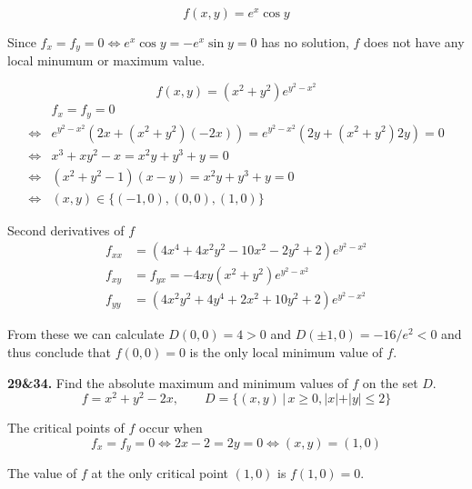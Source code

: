 \documentclass[a4paper,12pt]{article}
\newcommand{\exercise}[1]{\noindent\textbf{#1.}}
\begin{document}
\[f(x, y) = e^x\cos y\tag{13}\]

Since $f_x = f_y = 0 \iff e^x\cos y = -e^x\sin y = 0$ has no solution,
$f$ does not have any local minumum or maximum value.

\[f(x, y) = (x^2 + y^2)e^{y^2 - x^2}\tag{15}\]
\begin{align*}
  &f_x = f_y = 0\\
  \iff &e^{y^2 - x^2}(2x + (x^2 + y^2)(-2x))
      = e^{y^2 - x^2}(2y + (x^2 + y^2)2y) = 0\\
  \iff &x^3 + xy^2 - x = x^2y + y^3 + y = 0\\
  \iff &(x^2 + y^2 - 1)(x - y) = x^2y + y^3 + y = 0\\
  \iff &(x, y) \in \{(-1, 0), (0, 0), (1, 0)\}
\end{align*}

Second derivatives of $f$
\begin{align*}
  f_{xx} &= (4x^4 + 4x^2y^2 - 10x^2 - 2y^2 + 2)e^{y^2 - x^2}\\
  f_{xy} &= f_{yx} = -4xy(x^2 + y^2)e^{y^2 - x^2}\\
  f_{yy} &= (4x^2y^2 + 4y^4 + 2x^2 + 10y^2 + 2)e^{y^2 - x^2}
\end{align*}

From these we can calculate $D(0, 0) = 4 > 0$ and $D(\pm 1, 0) = -16/e^2 < 0$
and thus conclude that $f(0, 0) = 0$ is the only local minimum value of $f$.

\exercise{29\&34} Find the absolute maximum and minimum values of $f$
on the set $D$.
\[f = x^2 + y^2 - 2x,\qquad
D = \{(x, y) \,|\, x \geq 0, |x| + |y| \leq 2\}\tag{29}\]

The critical points of $f$ occur when
\[f_x = f_y = 0 \iff 2x - 2 = 2y = 0 \iff (x, y) = (1, 0)\]

The value of $f$ at the only critical point $(1, 0)$ is $f(1, 0) = 0$.

\end{document}
